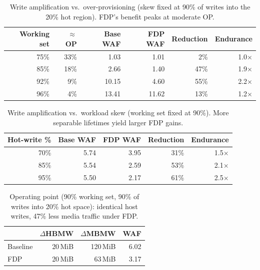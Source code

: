 
\begin{table}[t]
  \centering
  \caption{Write amplification vs.\ over-provisioning (skew fixed at 90\% of
  writes into the 20\% hot region). FDP's benefit peaks at moderate OP.}
  \label{tab:fdp-op}
  \begin{tabular}{rrrrrr}
    \toprule
    Working set & $\approx$OP & Base WAF & FDP WAF & Reduction & Endurance \\
    \midrule
    75\% & 33\% & 1.03  & 1.01  & 2\%  & 1.0$\times$ \\
    85\% & 18\% & 2.66  & 1.40  & 47\% & 1.9$\times$ \\
    92\% & 9\%  & 10.15 & 4.60  & 55\% & 2.2$\times$ \\
    96\% & 4\%  & 13.41 & 11.62 & 13\% & 1.2$\times$ \\
    \bottomrule
  \end{tabular}
\end{table}

\begin{table}[t]
  \centering
  \caption{Write amplification vs.\ workload skew (working set fixed at 90\%).
  More separable lifetimes yield larger FDP gains.}
  \label{tab:fdp-skew}
  \begin{tabular}{rrrrr}
    \toprule
    Hot-write \% & Base WAF & FDP WAF & Reduction & Endurance \\
    \midrule
    70\% & 5.74 & 3.95 & 31\% & 1.5$\times$ \\
    85\% & 5.54 & 2.59 & 53\% & 2.1$\times$ \\
    95\% & 5.50 & 2.17 & 61\% & 2.5$\times$ \\
    \bottomrule
  \end{tabular}
\end{table}

\begin{table}[t]
  \centering
  \caption{Operating point (90\% working set, 90\% of writes into 20\% hot
  space): identical host writes, 47\% less media traffic under FDP.}
  \label{tab:fdp-headline}
  \begin{tabular}{lrrr}
    \toprule
    & $\Delta$HBMW & $\Delta$MBMW & WAF \\
    \midrule
    Baseline & 20\,MiB & 120\,MiB & 6.02 \\
    FDP      & 20\,MiB & 63\,MiB  & 3.17 \\
    \bottomrule
  \end{tabular}
\end{table}
